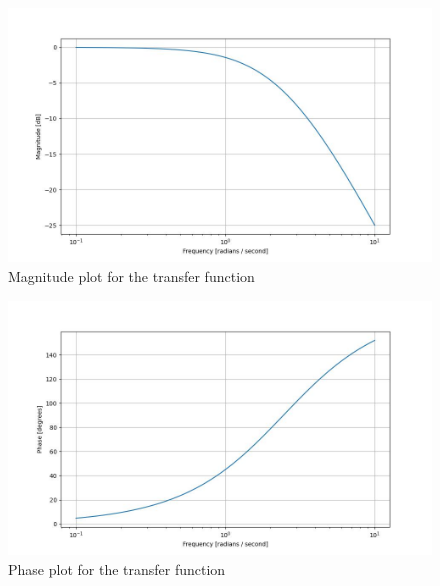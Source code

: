 \documentclass[journal,12pt,twocolumn]{IEEEtran}
\theoremstyle{remark}
\begin{document}
\begin{figure}[!ht]
\centering
\begin{center}
\includegraphics[width=\columnwidth]{Figure_1}
\end{center}
\caption{Magnitude plot for the transfer function}
\end{figure}
\begin{figure}[!ht]
\centering
\begin{center}
\includegraphics[width=\columnwidth]{Figure_2}
\end{center}
\caption{Phase plot for the transfer function}
\end{figure}
\end{document}
